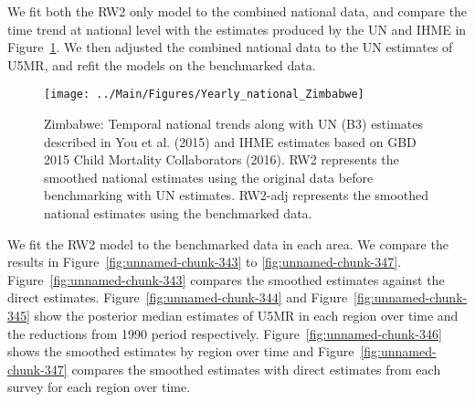 \documentclass[12pt]{article}\usepackage[]{graphicx}\usepackage[]{color}
\newenvironment{knitrout}{}{} %
\begin{document}
We fit both the RW2 only model to the combined national data, and compare the time trend at national level with the estimates produced by the UN and IHME in Figure~\ref{fig:unnamed-chunk-342}. We then adjusted the combined national data to the UN estimates of U5MR, and refit the models on the benchmarked data. 

\begin{knitrout}
\color{fgcolor}\begin{figure}[bht]

{\centering \texttt{[image: ../Main/Figures/Yearly\_national\_Zimbabwe]} 

}

\caption[Zimbabwe]{Zimbabwe: Temporal national trends along with UN (B3) estimates described in You et al. (2015) and IHME estimates based on GBD 2015 Child Mortality Collaborators (2016). RW2 represents the smoothed national estimates using the original data before benchmarking with UN estimates. RW2-adj represents the smoothed national estimates using the benchmarked data.}\label{fig:unnamed-chunk-342}
\end{figure}


\end{knitrout}
 

We fit the RW2 model to the benchmarked data in each area. 
We compare the results in Figure~\ref{fig:unnamed-chunk-343} to \ref{fig:unnamed-chunk-347}.
Figure~\ref{fig:unnamed-chunk-343} compares the smoothed estimates against the direct estimates. Figure~\ref{fig:unnamed-chunk-344} and Figure~\ref{fig:unnamed-chunk-345} show the posterior median estimates of U5MR in each region over time and the reductions from 1990 period respectively.
Figure~\ref{fig:unnamed-chunk-346} shows the smoothed estimates by region over time and Figure~\ref{fig:unnamed-chunk-347} compares the smoothed estimates with direct estimates from each survey for each region over time.




\end{document}
